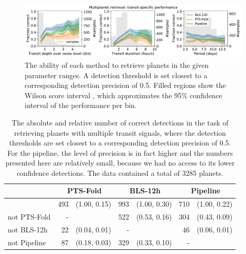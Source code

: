 \begin{figure}
    \centering
    \includegraphics[width=\linewidth]{Experiments/Figures/Multis/multi_transit_specific.pdf}
    \caption{The ability of each method to retrieve planets in the given parameter ranges. A detection threshold is set closest to a corresponding detection precision of 0.5. Filled regions show the Wilson score interval \cite{wilson1927probable}, which approximates the 95\% confidence interval of the performance per bin.}
    \label{fig:multi_transit}
\end{figure}

\begin{table}[]
\label{tab:multi_AnotB}
\centering
\begin{tabular}{@{}lrlrlrl@{}}
\toprule
             & \multicolumn{2}{c}{PTS-Fold} & \multicolumn{2}{c}{BLS-12h} & \multicolumn{2}{c}{Pipeline} \\ \midrule
             & 493      & (1.00, 0.15)      & 993      & (1.00, 0.30)     & 710      & (1.00, 0.22)      \\
not PTS-Fold & -        &                   & 522      & (0.53, 0.16)     & 304      & (0.43, 0.09)      \\
not BLS-12h  & 22       & (0.04, 0.01)      & -        &                  & 46       & (0.06, 0.01)      \\
not Pipeline & 87       & (0.18, 0.03)      & 329      & (0.33, 0.10)     & -        &                   \\ \bottomrule
\end{tabular}
\caption{The absolute and relative number of correct detections in the task of retrieving planets with multiple transit signals, where the detection thresholds are set closest to a corresponding detection precision of 0.5. For the pipeline, the level of precision is in fact higher and the numbers presented here are relatively small, because we had no access to its lower confidence detections. The data contained a total of 3285 planets.}
\end{table}

